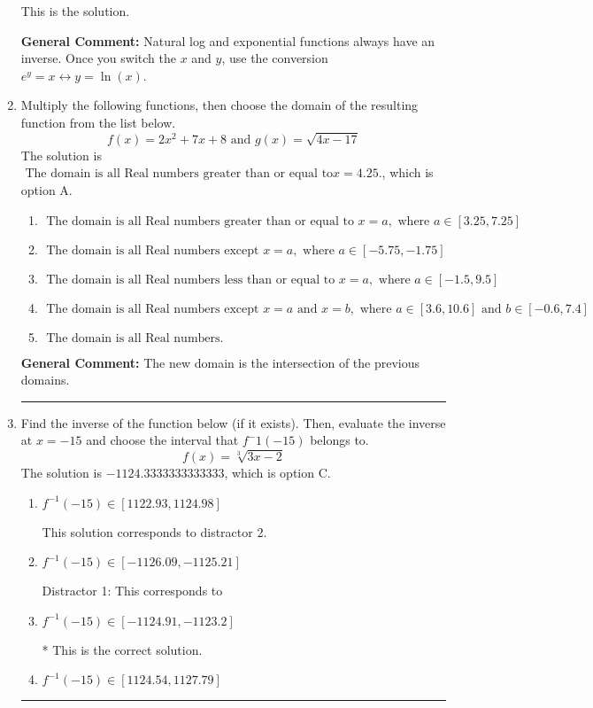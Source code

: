 \documentclass{extbook}[14pt]
\newcommand{\litem}[1]{\item #1

\rule{\textwidth}{0.4pt}}
\begin{document}
\begin{enumerate}
{\begin{enumerate}[label=\Alph*.]
 This is the solution.
\end{enumerate}

\textbf{General Comment:} Natural log and exponential functions always have an inverse. Once you switch the $x$ and $y$, use the conversion $ e^y = x \leftrightarrow y=\ln(x)$.
}
\litem{
Multiply the following functions, then choose the domain of the resulting function from the list below.
\[ f(x) = 2x^{2} +7 x + 8 \text{ and } g(x) = \sqrt{4x-17}  \]The solution is \( \text{ The domain is all Real numbers greater than or equal to} x = 4.25. \), which is option A.\begin{enumerate}[label=\Alph*.]
\item \( \text{ The domain is all Real numbers greater than or equal to } x = a, \text{ where } a \in [3.25, 7.25] \)


\item \( \text{ The domain is all Real numbers except } x = a, \text{ where } a \in [-5.75, -1.75] \)


\item \( \text{ The domain is all Real numbers less than or equal to } x = a, \text{ where } a \in [-1.5, 9.5] \)


\item \( \text{ The domain is all Real numbers except } x = a \text{ and } x = b, \text{ where } a \in [3.6, 10.6] \text{ and } b \in [-0.6, 7.4] \)


\item \( \text{ The domain is all Real numbers. } \)


\end{enumerate}

\textbf{General Comment:} The new domain is the intersection of the previous domains.
}
\litem{
Find the inverse of the function below (if it exists). Then, evaluate the inverse at $x = -15$ and choose the interval that $f^-1(-15)$ belongs to.
\[ f(x) = \sqrt[3]{3 x - 2} \]The solution is \( -1124.3333333333333 \), which is option C.\begin{enumerate}[label=\Alph*.]
\item \( f^{-1}(-15) \in [1122.93, 1124.98] \)

 This solution corresponds to distractor 2.
\item \( f^{-1}(-15) \in [-1126.09, -1125.21] \)

 Distractor 1: This corresponds to 
\item \( f^{-1}(-15) \in [-1124.91, -1123.2] \)

* This is the correct solution.
\item \( f^{-1}(-15) \in [1124.54, 1127.79] \)


\end{enumerate}}
\end{enumerate}
\end{document}
